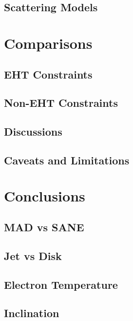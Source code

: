 \documentclass[twocolumn,twocolappendix,tighten,dvipsnames,linenumbers]{aastex63}
\begin{document}
\subsection{Scattering Models}

\section{Comparisons}

\subsection{EHT Constraints}

\subsection{Non-EHT Constraints}

\subsection{Discussions}

\subsection{Caveats and Limitations}

\section{Conclusions}

\subsection{MAD vs SANE}

\subsection{Jet vs Disk}

\subsection{Electron Temperature}

\subsection{Inclination}
\end{document}
